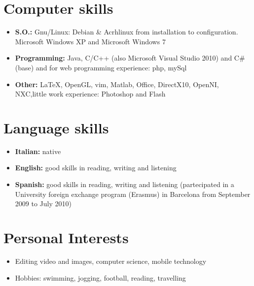 \documentclass[pdftex,a4paper,12pt,twoside,titlepage,italian,openright]{article}
\newcommand{\sezione}[1]{\section*{\textcolor{theme-color!70}{#1}}}
\begin{document}
\sezione{Computer skills}
\begin{itemize}
	\item \textbf{S.O.:} Gnu/Linux: Debian \& Acrhlinux from installation to configuration. Microsoft Windows XP and Microsoft Windows 7
	\item \textbf{Programming:} Java, C/C++ (also Microsoft Visual Studio 2010) and C\# (base) and for web programming experience: php, mySql
	\item \textbf{Other:} \LaTeX, OpenGL, vim, Matlab, Office, DirectX10, OpenNI,
	NXC,little work experience: Photoshop and Flash
\end{itemize}
\sezione{Language skills}
\begin{itemize}
	\item \textbf{Italian:} native
	\item \textbf{English:} good skills in reading, writing and listening
	\item \textbf{Spanish:} good skills in reading, writing and listening (partecipated in a University foreign exchange program (Erasmus) in Barcelona from September 2009 to July 2010)
\end{itemize}
\sezione{Personal Interests}
\begin{itemize}
	\item Editing video and images, computer science, mobile technology
	\item Hobbies: swimming, jogging, football, reading, travelling
\end{itemize}
\end{document}
